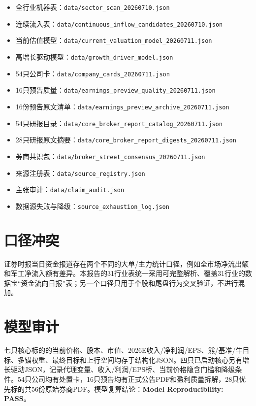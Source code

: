 \begin{itemize}
  \item 全行业机器表：\texttt{data/sector\_scan\_20260710.json}
  \item 连续流入表：\texttt{data/continuous\_inflow\_candidates\_20260710.json}
  \item 当前估值模型：\texttt{data/current\_valuation\_model\_20260711.json}
  \item 高增长驱动模型：\texttt{data/growth\_driver\_model.json}
  \item 54只公司卡：\texttt{data/company\_cards\_20260711.json}
  \item 16只预告质量：\texttt{data/earnings\_preview\_quality\_20260711.json}
  \item 16份预告原文清单：\texttt{data/earnings\_preview\_archive\_20260711.json}
  \item 54只研报目录：\texttt{data/core\_broker\_report\_catalog\_20260711.json}
  \item 28只研报原文摘要：\texttt{data/core\_broker\_report\_digests\_20260711.json}
  \item 券商共识包：\texttt{data/broker\_street\_consensus\_20260711.json}
  \item 来源注册表：\texttt{data/source\_registry.json}
  \item 主张审计：\texttt{data/claim\_audit.json}
  \item 数据源失败与降级：\texttt{source\_exhaustion\_log.json}
\end{itemize}

\section{口径冲突}

证券时报当日资金报道存在两个不同的大单/主力统计口径，例如全市场净流出额和军工净流入额有差异。本报告的31行业表统一采用可完整解析、覆盖31行业的数据宝“资金流向日报”表；另一个口径只用于个股和尾盘行为交叉验证，不进行混加。

\section{模型审计}

七只核心标的的当前价格、股本、市值、2026E收入/净利润/EPS、熊/基准/牛目标、多锚权重、最终目标和上行空间均存于结构化JSON。四只已启动核心另有增长驱动JSON，记录代理变量、收入/利润/EPS桥、当前价格隐含门槛和降级条件。54只公司均有处置卡，16只预告均有正式公告PDF和盈利质量拆解，28只优先标的共56份原始券商PDF。模型复算结论：\textbf{Model Reproducibility: PASS}。
